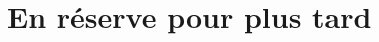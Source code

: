 \begin{MentalActivity}



\end{MentalActivity}

\section{En réserve pour plus tard}

\setcounter{numactivmentale}{1}






